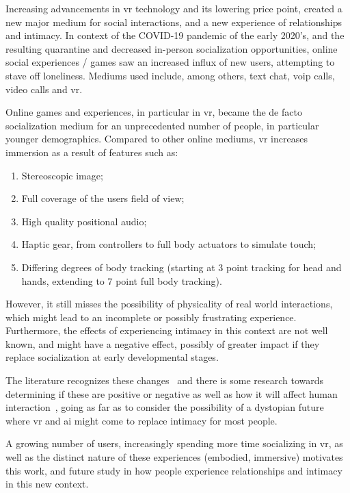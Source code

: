 
Increasing advancements in \gls{vr} technology and its lowering price point, created a new major medium for social interactions, and a new experience of relationships and intimacy.
In context of the COVID-19 pandemic of the early 2020's, and the resulting quarantine and decreased in-person socialization opportunities, online social experiences / games saw an increased influx of new users, attempting to stave off loneliness.
Mediums used include, among others, text chat, \gls{voip} calls, video calls and \gls{vr}. 

Online games and experiences, in particular in \gls{vr}, became the de facto socialization medium for an unprecedented number of people, in particular younger demographics.
Compared to other online mediums, \Gls{vr} increases immersion as a result of features such as:
\begin{enumerate}
	\item Stereoscopic image;
	\item Full coverage of the users field of view;
	\item High quality positional audio;
	\item Haptic gear, from controllers to full body actuators to simulate touch;
	\item Differing degrees of body tracking (starting at 3 point tracking for head and hands, extending to 7 point full body tracking).
\end{enumerate} 
However, it still misses the possibility of physicality of real world interactions, which might lead to an incomplete or possibly frustrating experience.
Furthermore, the effects of experiencing intimacy in this context are not well known, and might have a negative effect, possibly of greater impact if they replace socialization at early developmental stages.

The literature recognizes these changes~\cite{power2020new} and there is some research towards determining if these are positive or negative as well as how it will affect human interaction~\cite[Chapter~8]{Kanwal2019}, going as far as to consider the possibility of a dystopian future where \gls{vr} and \gls{ai} might come to replace intimacy for most people.

A growing number of users, increasingly spending more time socializing in \gls{vr}, as well as the distinct nature of these experiences (\eg embodied, immersive) motivates this work, and future study in how people experience relationships and intimacy in this new context.


